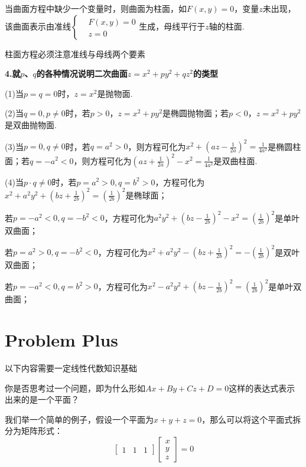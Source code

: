 当曲面方程中缺少一个变量时，则曲面为柱面，如$F(x,y)=0$，变量$z$未出现，该曲面表示由准线$\left\{\begin{aligned}& F(x,y)=0 \\ & z=0 \end{aligned}\right.$生成，母线平行于$z$轴的柱面.

柱面方程必须注意准线与母线两个要素

\textbf{4.就$p$、$q$的各种情况说明二次曲面$z=x^2+py^2+qz^2$的类型}

(1)当$p=q=0$时，$z=x^2$是抛物面.

(2)当$q=0,p\neq0$时，若$p>0$，$z=x^2+py^2$是椭圆抛物面；若$p<0$，$z=x^2+py^2$是双曲抛物面.

(3)当$p=0,q\neq0$时，若$q=a^2>0$，则方程可化为$x^2+\left(az-\frac{1}{2a}\right)^2=\frac{1}{4a^2}$是椭圆柱面；若$q=-a^2<0$，则方程可化为$\left(az+\frac{1}{2a}\right)^2-x^2=\frac{1}{4a^2}$是双曲柱面.

(4)当$p\cdot q\neq0$时，若$p=a^2>0,q=b^2>0$，方程可化为$x^2+a^2y^2+\left(bz+\frac{1}{2b}\right)^2=\left(\frac{1}{2b}\right)^2$是椭球面；

若$p=-a^2<0,q=-b^2<0$，方程可化为$a^2y^2+\left(bz-\frac{1}{2b}\right)^2-x^2=\left(\frac{1}{2b}\right)^2$是单叶双曲面；

若$p=a^2>0,q=-b^2<0$，方程可化为$x^2+a^2y^2-\left(bz+\frac{1}{2b}\right)^2=-\left(\frac{1}{2b}\right)^2$是双叶双曲面；

若$p=-a^2<0,q=b^2>0$，方程可化为$x^2-a^2y^2+\left(bz-\frac{1}{2b}\right)^2=\left(\frac{1}{2b}\right)^2$是单叶双曲面；

\newpage
{}
\section*{Problem Plus}
\begin{note}
    以下内容需要一定线性代数知识基础
\end{note}

你是否思考过一个问题，即为什么形如$Ax+By+Cz+D=0$这样的表达式表示出来的是一个平面？

我们举一个简单的例子，假设一个平面为$x+y+z=0$，那么可以将这个平面式拆分为矩阵形式：
\begin{equation}
    \begin{bmatrix}
        1 & 1 & 1
    \end{bmatrix}
    \begin{bmatrix}
        x \\ y \\ z
    \end{bmatrix}
    =0
    \nonumber
\end{equation}

